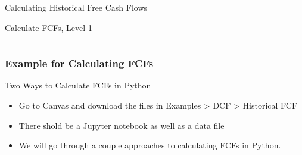 \documentclass[handout, 11pt]{beamer}
\begin{document}
\begin{section}{Calculating Historical Free Cash Flows}
\begin{frame}
{\begin{block}{Calculate FCFs, Level 1}
\begin{tabular*}{\textwidth}{@{\extracolsep{\fill}}cccc}
\end{tabular*}
\end{block}
}
\label{lab:dcf-fcf-calc-1}
\end{frame}
\begin{frame}
\frametitle{Example for Calculating FCFs}
{
\begin{block}{Two Ways to Calculate FCFs in Python}
\begin{itemize}
\item Go to Canvas and download the files in Examples > DCF > Historical FCF
\item There shold be a Jupyter notebook as well as a data file
\item We will go through a couple approaches to calculating FCFs in Python.
\end{itemize}
\end{block}
}
\end{frame}
\end{section}
\end{document}
